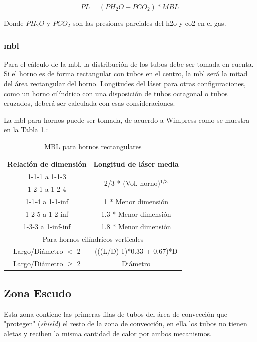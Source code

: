 \begin{equation}
\label{eq:pl}
PL = (PH_2O + PCO_2) * MBL
\end{equation}

\par Donde $PH_2O$ y $PCO_2$ son las presiones parciales del \ac{h2o} y \ac{co2} en el gas.

\subsubsection{\ac{mbl}}
\par Para el cálculo de la \ac{mbl}, la distribución de los tubos debe ser tomada en cuenta. Si el horno es de forma rectangular con tubos en el centro, la \ac{mbl} será la mitad del área rectangular del horno. Longitudes del láser para otras configuraciones, como un horno cilíndrico con una disposición de tubos octagonal o tubos cruzados, deberá ser calculada con esas consideraciones.

\par La \ac{mbl} para hornos puede ser tomada, de acuerdo a Wimpress\cite{bib:wimpress} como se muestra en la Tabla \ref{tbl:mbl}.:

\begin{table}
    \centering
    \begin{tabular}{c|c}
        Relación de dimensión  & Longitud de láser media \\
        \hline
        1-1-1 a 1-1-3   & \multirow{2}{10em}{2/3 * (Vol. horno)$^{1/3}$} \\
        1-2-1 a 1-2-4   & \\
        \hline
        1-1-4 a 1-1-inf & 1 * Menor dimensión \\
        \hline
        1-2-5 a 1-2-inf   & 1.3 * Menor dimensión \\
        \hline
        1-3-3 a 1-inf-inf & 1.8 * Menor dimensión \\
        \hline
        \multicolumn{2}{c}{Para hornos cilíndricos verticales} \\
        \hline
        Largo/Diámetro $<$ 2  & (((L/D)-1)*0.33 + 0.67)*D\\
        \hline
        Largo/Diámetro $\geq$ 2 & Diámetro\\
    \end{tabular}
    \caption{MBL para hornos rectangulares}
    \label{tbl:mbl}
\end{table}

\subsection{Zona Escudo}
\par Esta zona contiene las primeras filas de tubos del área de convección que "protegen" (\textit{shield}) el resto de la zona de convección, en ella los tubos no tienen aletas y reciben la misma cantidad de calor por ambos mecanismos.

